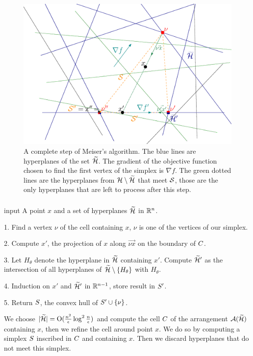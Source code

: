 \documentclass[10pt,xcolor=x11names,dvipsnames,hyperref={colorlinks=false,breaklinks=true,bookmarks=true}]{beamer}
\begin{document}
\begin{frame}\frametitle{\insertsection}\justifying
\begin{figure}
\begin{center}
\includegraphics[trim=110 40 50 30,clip=true,height=0.6\textheight]{../report/fig/point-location/simplex.eps}
\caption{
A complete step of Meiser's algorithm. The blue lines are hyperplanes of the
set \(\widetilde{\H}\). The gradient of the objective function
chosen to find the first vertex of the simplex is \(\nabla f\). The green dotted lines are the
hyperplanes from \(\H \setminus \widetilde{\H}\) that meet \(\S\), those are
the only hyperplanes that are left to process after this step.
}
\end{center}
\end{figure}
\end{frame}

\begin{frame}\frametitle{\insertsection}\justifying
\begin{algo}
\item[input] A point \(x\) and a set of hyperplanes \(\widetilde{\H}\) in
\(\R^n\).
\item[1.] Find a vertex $\nu$ of the cell containing $x$, $\nu$ is one of
the vertices of our simplex.
\item[2.] Compute $x'$, the projection of $x$ along $\vec{\nu x}$ on the
boundary of \(\cell\).
\item[3.] Let \(H_{\theta}\) denote the hyperplane in \(\widetilde{\H}\)
containing \(x'\). Compute \(\widetilde{\H}'\) as the intersection of all
hyperplanes of \(\widetilde{\H} \setminus \enum{H_{\theta}}\) with
\(H_{\theta}\).
\item[4.] Induction on \(x'\) and \(\widetilde{\H}'\) in $\R^{n-1}$, store result in \(\simplex'\).
\item[5.] Return \(\simplex\), the convex hull of \(\simplex' \cup \enum{\nu}\).
\end{algo}\pause
We choose \(\card{\Ht} = \BigO{\enetsize}\) and compute  the cell $\cell$ of the
arrangement $\arrangement(\Ht)$ containing $x$, then we refine the cell around
point $x$. We do so by computing a simplex $\simplex$ inscribed in $\cell$ and
containing \(x\). Then we discard hyperplanes that do not meet this simplex.
\end{frame}
\end{document}
